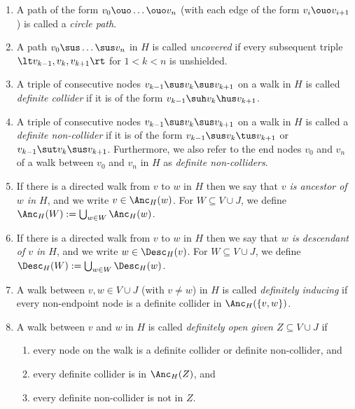 \begin{Def}
\begin{enumerate}
      with the bidirected edge $w \huh v$.
    \item A path of the form $v_0 \ouo \dots \ouo v_n$ (with each edge of the form $v_i \ouo v_{i+1}$) is called a \emph{circle path}.
    \item A path $v_0 \sus \dots \sus v_n$ in $H$ is called \emph{uncovered} if every subsequent triple $\lt v_{k-1}, v_k, v_{k+1} \rt$ for $1 < k < n$ is unshielded.
    \item A triple of consecutive nodes $v_{k-1} \sus v_k \sus v_{k+1}$ on a walk in $H$ is called \emph{definite collider}
      if it is of the form $v_{k-1} \suh v_k \hus v_{k+1}$.
    \item A triple of consecutive nodes $v_{k-1} \sus v_k \sus v_{k+1}$ on a walk in $H$ is called a \emph{definite non-collider}
      if it is of the form $v_{k-1} \sus v_k \tus v_{k+1}$ or $v_{k-1} \sut v_k \sus v_{k+1}$.
      Furthermore, we also refer to the end nodes $v_0$ and $v_n$ of a walk between $v_0$ and $v_n$ in $H$ as \emph{definite non-colliders}.
    \item If there is a directed walk from $v$ to $w$ in $H$ then we say that \emph{$v$ is ancestor of $w$ in $H$}, 
      and we write $v \in \Anc_H(w)$. For $W \subseteq V \cup J$, we define $\Anc_H(W) := \bigcup_{w\in W} \Anc_H(w)$.
    \item If there is a directed walk from $v$ to $w$ in $H$ then we say that \emph{$w$ is descendant of $v$ in $H$}, 
      and we write $w \in \Desc_H(v)$. For $W \subseteq V \cup J$, we define $\Desc_H(W) := \bigcup_{w\in W} \Desc_H(w)$.
    \item A walk between $v,w \in V \cup J$ (with $v \ne w$) in $H$ is called \emph{definitely inducing} if every non-endpoint node is a definite collider in $\Anc_H(\{v,w\})$.
    \item A walk between $v$ and $w$ in $H$ is called \emph{definitely open given $Z \subseteq V \cup J$} if
      \begin{enumerate}
        \item every node on the walk is a definite collider or definite non-collider, and
        \item every definite collider is in $\Anc_H(Z)$, and
        \item every definite non-collider is not in $Z$.
      \end{enumerate}
  \end{enumerate}
\end{Def}

